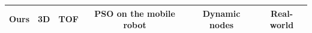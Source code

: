 \documentclass{ieeeaccess}
\begin{document}
\begin{table}[ht]
\begin{tabular}{|l|l|l|l|l|l|}
		Ours&
		\multicolumn{1}{c|}{3D \checkmark}                   &      
		\multicolumn{1}{c|}{TOF}                 &   \multicolumn{1}{c|}{PSO on the mobile robot \checkmark}                   & 
		\multicolumn{1}{c|}{Dynamic nodes \checkmark}        &   \multicolumn{1}{c|}{Real-world \checkmark}   \\ \hline
	\end{tabular}
\end{table}


%		
%		
%		
%		
\end{document}
